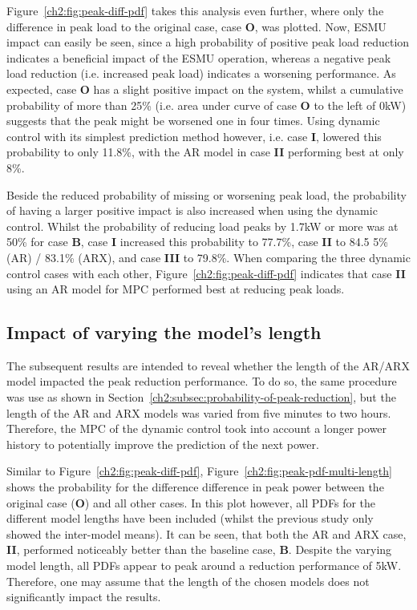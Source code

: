 

Figure~\ref{ch2:fig:peak-diff-pdf} takes this analysis even further, where only the difference in peak load to the original case, case \textbf{O}, was plotted.
Now, ESMU impact can easily be seen, since a high probability of positive peak load reduction indicates a beneficial impact of the ESMU operation, whereas a negative peak load reduction (i.e. increased peak load) indicates a worsening performance.
As expected, case \textbf{O} has a slight positive impact on the system, whilst a cumulative probability of more than 25\% (i.e. area under curve of case \textbf{O} to the left of 0kW) suggests that the peak might be worsened one in four times.
Using dynamic control with its simplest prediction method however, i.e. case \textbf{I}, lowered this probability to only 11.8\%, with the AR model in case \textbf{II} performing best at only 8\%.

Beside the reduced probability of missing or worsening peak load, the probability of having a larger positive impact is also increased when using the dynamic control.
Whilst the probability of reducing load peaks by 1.7kW or more was at 50\% for case \textbf{B}, case \textbf{I} increased this probability to 77.7\%, case \textbf{II} to 84.5 5\% (AR) / 83.1\% (ARX), and case \textbf{III} to 79.8\%.
When comparing the three dynamic control cases with each other, Figure~\ref{ch2:fig:peak-diff-pdf} indicates that case \textbf{II} using an AR model for MPC performed best at reducing peak loads.

\subsection{Impact of varying the model's length}

The subsequent results are intended to reveal whether the length of the AR/ARX model impacted the peak reduction performance.
To do so, the same procedure was use as shown in Section~\ref{ch2:subsec:probability-of-peak-reduction}, but the length of the AR and ARX models was varied from five minutes to two hours.
Therefore, the MPC of the dynamic control took into account a longer power history to potentially improve the prediction of the next power.



Similar to Figure~\ref{ch2:fig:peak-diff-pdf}, Figure~\ref{ch2:fig:peak-pdf-multi-length} shows the probability for the difference difference in peak power between the original case (\textbf{O}) and all other cases.
In this plot however, all PDFs for the different model lengths have been included (whilst the previous study only showed the inter-model means).
It can be seen, that both the AR and ARX case, \textbf{II}, performed noticeably better than the baseline case, \textbf{B}.
Despite the varying model length, all PDFs appear to peak around a reduction performance of 5kW.
Therefore, one may assume that the length of the chosen models does not significantly impact the results.

